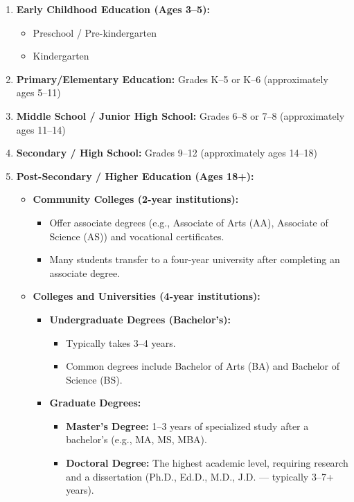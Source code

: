 \begin{enumerate}
    \item \textbf{Early Childhood Education (Ages 3--5):}
    \begin{itemize}
        \item Preschool / Pre-kindergarten
        \item Kindergarten
    \end{itemize}

    \item \textbf{Primary/Elementary Education:} Grades K--5 or K--6 (approximately ages 5--11)

    \item \textbf{Middle School / Junior High School:} Grades 6--8 or 7--8 (approximately ages 11--14)

    \item \textbf{Secondary / High School:} Grades 9--12 (approximately ages 14--18)

    \item \textbf{Post-Secondary / Higher Education (Ages 18+):}
    \begin{itemize}
        \item \textbf{Community Colleges (2-year institutions):}
        \begin{itemize}
            \item Offer associate degrees (e.g., Associate of Arts (AA), Associate of Science (AS)) and vocational certificates.
            \item Many students transfer to a four-year university after completing an associate degree.
        \end{itemize}

        \item \textbf{Colleges and Universities (4-year institutions):}
        \begin{itemize}
            \item \textbf{Undergraduate Degrees (Bachelor's):}
            \begin{itemize}
                \item Typically takes 3--4 years.
                \item Common degrees include Bachelor of Arts (BA) and Bachelor of Science (BS).
            \end{itemize}

            \item \textbf{Graduate Degrees:}
            \begin{itemize}
                \item \textbf{Master's Degree:} 1--3 years of specialized study after a bachelor's (e.g., MA, MS, MBA).
                \item \textbf{Doctoral Degree:} The highest academic level, requiring research and a dissertation (Ph.D., Ed.D., M.D., J.D. — typically 3--7+ years).
            \end{itemize}
        \end{itemize}
    \end{itemize}
\end{enumerate}

